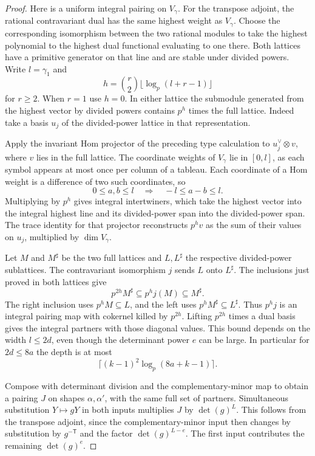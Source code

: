 \begin{proof}
Here is a uniform integral pairing on \(V_\gamma\).
For the transpose adjoint, the rational contravariant dual has
the same highest weight as \(V_\gamma\). Choose the corresponding
isomorphism between the two rational modules to take the highest
polynomial to the highest dual functional evaluating to one
there. Both lattices have a primitive generator on that line
and are stable under divided powers. Write \(l=\gamma_1\)
and
\[
 h=\binom r2\lfloor\log_p(l+r-1)\rfloor
\]
for \(r\ge2\).
When \(r=1\) use \(h=0\).
In either lattice the submodule generated from the highest
vector by divided powers contains \(p^h\) times the full lattice.
Indeed take a basis \(u_j\) of the divided-power lattice in
that representation.

Apply the invariant Hom projector of the
preceding type calculation to \(u_j^\vee\otimes v\), where
\(v\) lies in the full lattice. The coordinate weights of
\(V_\gamma\) lie in \([0,l]\), as each symbol appears at most
once per column of a tableau. Each coordinate of a Hom weight is a difference of two such coordinates, so
\[
 0\le a,b\le l\quad\Longrightarrow\quad -l\le a-b\le l.
\]
Multiplying by \(p^h\) gives integral intertwiners,
which take the highest vector into the integral highest line
and its divided-power span into the divided-power span.
The trace identity for that projector reconstructs \(p^h v\)
as the sum of their values on \(u_j\), multiplied by
\(\dim V_\gamma\).

Let \(M\) and \(M^\sharp\) be the two full lattices and
\(L,L^\sharp\) the respective divided-power sublattices.
The contravariant isomorphism \(j\) sends \(L\) onto \(L^\sharp\).
The inclusions just proved in both lattices give
\[
 p^{2h}M^\sharp\subseteq p^h j(M)\subseteq M^\sharp .
\]
The right inclusion uses \(p^h M\subseteq L\), and the
left uses \(p^h M^\sharp\subseteq L^\sharp\).
Thus \(p^h j\) is an integral pairing map with cokernel
killed by \(p^{2h}\). Lifting \(p^{2h}\) times a dual basis
gives the integral partners with those diagonal values. This bound depends on the width
\(l\le2d\), even though the determinant power \(e\) can be
large. In particular for \(2d\le8a\) the depth is at most
\[
 \lceil (k-1)^2\log_p(8a+k-1)\rceil.
\]

Compose with determinant division and the complementary-minor
map to obtain a pairing \(J\) on shapes \(\alpha,\alpha'\),
with the same full set of partners. Simultaneous substitution
\(Y\mapsto gY\) in both inputs multiplies \(J\) by
\(\det(g)^L\). This follows from the transpose adjoint,
since the complementary-minor input then changes by
substitution by \(g^{-\mathsf T}\) and the factor
\(\det(g)^{L-e}\). The first input contributes the remaining
\(\det(g)^e\).


\end{proof}
